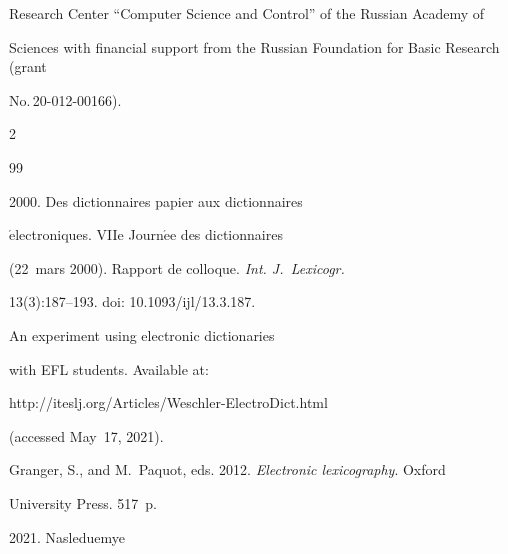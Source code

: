 Research Center ``Computer Science and Control'' of the Russian Academy of 


Sciences with financial support from the Russian Foundation for Basic Research (grant 


No.\,20-012-00166).










  \begin{multicols}{2}





\renewcommand{\bibname}{\protect\rmfamily References}







{\small\frenchspacing


 {%




 \begin{thebibliography}{99}




 2000. Des dictionnaires papier aux dictionnaires 


$\acute{\mbox{e}}$lectroniques. VIIe Journ$\acute{\mbox{e}}$e des dictionnaires 


(22~mars 2000). Rapport de colloque. \textit{Int. J.~Lexicogr.}  


13(3):187--193. doi: 10.1093/ijl/13.3.187.




  An experiment using electronic dictionaries 


with EFL students. Available at: {\sf  


http://iteslj.org/Articles/Weschler-ElectroDict.html} (accessed May~17, 2021).




Granger, S., and M.~Paquot, eds. 2012. \textit{Electronic lexicography}. Oxford 


University Press. 517~p.




 2021. Nasleduemye 



\end{thebibliography}}}
\end{multicols}
